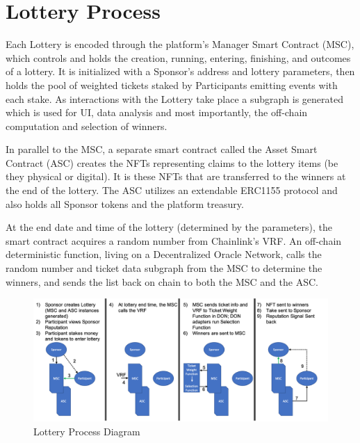 \documentclass[runningheads]{llncs}
\begin{document}
\section{Lottery Process}\label{section-LotteryProcess}
Each Lottery is encoded through the platform’s Manager Smart Contract (MSC), which controls and holds the creation, running, entering, finishing, and outcomes of a lottery.  It is initialized with a Sponsor’s address and lottery parameters, then holds the pool of weighted tickets staked by Participants emitting events with each stake.  As interactions with the Lottery take place a subgraph is generated which is used for UI, data analysis and most importantly, the off-chain computation and selection of winners.

In parallel to the MSC, a separate smart contract called the Asset Smart Contract (ASC) creates the NFTs representing claims to the lottery items (be they physical or digital).  It is these NFTs that are transferred to the winners at the end of the lottery.  The ASC utilizes an extendable ERC1155 protocol and also holds all Sponsor tokens and the platform treasury.

At the end date and time of the lottery (determined by the parameters), the smart contract acquires a random number from Chainlink’s VRF.  An off-chain deterministic function, living on a Decentralized Oracle Network, calls the random number and ticket data subgraph from the MSC to determine the winners, and sends the list back on chain to both the MSC and the ASC.

\begin{figure}[H]
\centering
\includegraphics[scale=0.9]{Figures_and_Tables/LotteryProcessDiagram.png}
\caption{Lottery Process Diagram}
\end{figure}
\end{document}
